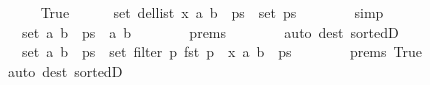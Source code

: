 \begin{isabellebody}
\ \ \ \ \isamarkupfalse%
\ True\isanewline
\ \ \ \ \isamarkupfalse%
\ {\isachardoublequoteopen}set\ {\isacharparenleft}{\kern0pt}del{\isacharunderscore}{\kern0pt}list\ x\ {\isacharparenleft}{\kern0pt}{\isacharparenleft}{\kern0pt}a{\isacharcomma}{\kern0pt}\ b{\isacharparenright}{\kern0pt}\ {\isacharhash}{\kern0pt}\ ps{\isacharparenright}{\kern0pt}{\isacharparenright}{\kern0pt}\ {\isacharequal}{\kern0pt}\ set\ ps{\isachardoublequoteclose}\isanewline
\ \ \ \ \ \ \isamarkupfalse%
\ simp\isanewline
\ \ \ \ \isamarkupfalse%
\ \isamarkupfalse%
\ {\isachardoublequoteopen}{\isachardot}{\kern0pt}{\isachardot}{\kern0pt}{\isachardot}{\kern0pt}\ {\isacharequal}{\kern0pt}\ set\ {\isacharparenleft}{\kern0pt}{\isacharparenleft}{\kern0pt}a{\isacharcomma}{\kern0pt}\ b{\isacharparenright}{\kern0pt}\ {\isacharhash}{\kern0pt}\ ps{\isacharparenright}{\kern0pt}\ {\isacharminus}{\kern0pt}\ {\isacharbraceleft}{\kern0pt}{\isacharparenleft}{\kern0pt}a{\isacharcomma}{\kern0pt}\ b{\isacharparenright}{\kern0pt}{\isacharbraceright}{\kern0pt}{\isachardoublequoteclose}\isanewline
\ \ \ \ \ \ \isamarkupfalse%
\ {\isachardoublequoteopen}{}{\isachardot}{\kern0pt}prems{\isachardoublequoteclose}\isanewline
\ \ \ \ \ \ \isamarkupfalse%
\ {\isacharparenleft}{\kern0pt}auto\ dest{\isacharcolon}{\kern0pt}\ sorted{}D{\isacharparenright}{\kern0pt}\isanewline
\ \ \ \ \isamarkupfalse%
\ \isamarkupfalse%
\ {\isachardoublequoteopen}{\isachardot}{\kern0pt}{\isachardot}{\kern0pt}{\isachardot}{\kern0pt}\ {\isacharequal}{\kern0pt}\ set\ {\isacharparenleft}{\kern0pt}{\isacharparenleft}{\kern0pt}a{\isacharcomma}{\kern0pt}\ b{\isacharparenright}{\kern0pt}\ {\isacharhash}{\kern0pt}\ ps{\isacharparenright}{\kern0pt}\ {\isacharminus}{\kern0pt}\ set\ {\isacharparenleft}{\kern0pt}filter\ {\isacharparenleft}{\kern0pt}{\isasymlambda}p{\isachardot}{\kern0pt}\ fst\ p\ {\isacharequal}{\kern0pt}\ x{\isacharparenright}{\kern0pt}\ {\isacharparenleft}{\kern0pt}{\isacharparenleft}{\kern0pt}a{\isacharcomma}{\kern0pt}\ b{\isacharparenright}{\kern0pt}\ {\isacharhash}{\kern0pt}\ ps{\isacharparenright}{\kern0pt}{\isacharparenright}{\kern0pt}{\isachardoublequoteclose}\isanewline
\ \ \ \ \ \ \isamarkupfalse%
\ {\isachardoublequoteopen}{}{\isachardot}{\kern0pt}prems{\isachardoublequoteclose}\ True\isanewline
\ \ \ \ \ \ \isamarkupfalse%
\ {\isacharparenleft}{\kern0pt}auto\ dest{\isacharcolon}{\kern0pt}\ sorted{}D{\isacharparenright}{\kern0pt}\isanewline

\end{isabellebody}
